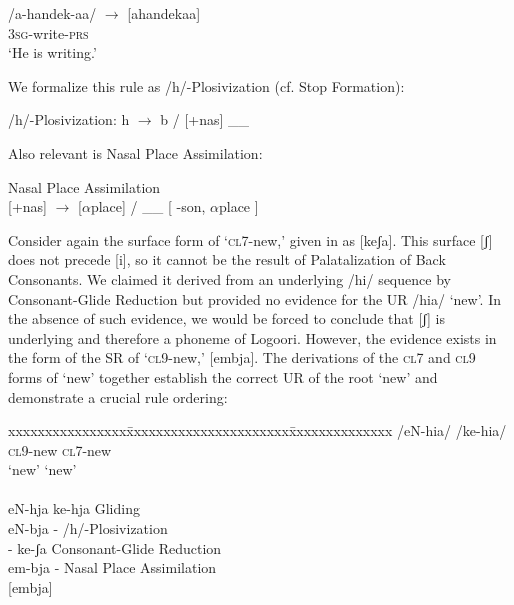 \documentclass[output=paper]{langsci/langscibook}
\begin{document}
\ex\label{ex:glewwe:14c}{}
/a-handek-aa/  $\rightarrow$  [ahandekaa]\\{}
\textsc{3sg}-write-\textsc{prs}\\{}
\glt ‘He is writing.’
\z
\z 

We formalize this rule as /h/-Plosivization (cf.  Stop Formation):

\ea\label{ex:glewwe:15}{}
/h/-Plosivization: h $\rightarrow$ b / [+nas] \_\_ {\rmfnm}
\z
{}




Also relevant is Nasal Place Assimilation:


\ea\label{ex:glewwe:16}{}
Nasal Place Assimilation \citep[116]{Leung1991}\\{}
[+nas] $\rightarrow$ [$\alpha${place}] / \_\_ {[} -son, $\alpha${place} {]}
\z



Consider again the surface form of ‘\textsc{cl}7-new,’ given in  as [keʃa]. This surface [ʃ] does not precede [i], so it cannot be the result of Palatalization of Back Consonants. We claimed it derived from an underlying /hi/ sequence by Consonant-Glide Reduction but provided no evidence for the UR /hia/ ‘new’. In the absence of such evidence, we would be forced to conclude that [ʃ] is underlying and therefore a phoneme of Logoori. However, the evidence exists in the form of the SR of ‘\textsc{cl}9-new,’ [embja]. The derivations of the \textsc{cl}7 and \textsc{cl}9 forms of ‘new’ together establish the correct UR of the root ‘new’ and demonstrate a crucial rule ordering:


\ea\label{ex:glewwe:17}{} 

\begin{tabbing}
xxxxxxxxxxxxxxxx\=xxxxxxxxxxxxxxxxxxxxxx\=xxxxxxxxxxxxxx\kill
/eN-hia/
{\dummyslash} \> /ke-hia/ \\ 
\textsc{cl9}-new \>  \textsc{cl7}-new \> \\
‘new’ \>  ‘new’ \\
   \\
{\dummyslash}eN-hja   \>   ke-hja    \>    Gliding\\
{\dummyslash}eN-bja   \>   {}-   \>     /h/-Plosivization\\
{\dummyslash}{}-    \>    ke-ʃa     \>   Consonant-Glide Reduction\\
{\dummyslash}em-bja  \>    {}-     \>   Nasal Place Assimilation\\
{[embja]}    \>  [keʃa]     
\end{tabbing}
\z
\end{document}
